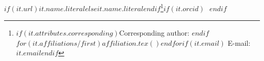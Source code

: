 $if(it.url)$\href{$it.url$}{$it.name.literal$}$else$$it.name.literal$$endif$\footnote{$if(it.attributes.corresponding)$Corresponding author: $endif$$for(it.affiliations/first)$$affiliation.tex()$$endfor$$if(it.email)$ E-mail: \texttt{$it.email$}$endif$}$if(it.orcid)$\,~$endif$
